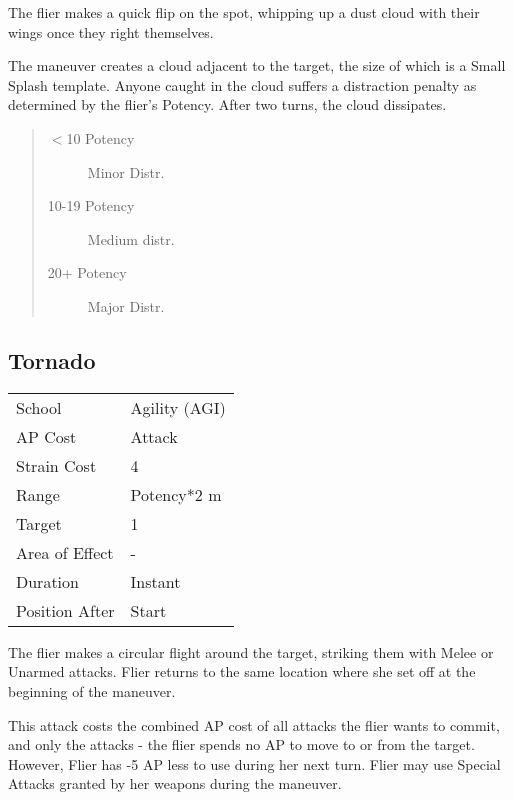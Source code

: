 \documentclass[11pt,a4paper,twocolumn]{book}
\begin{document}
\medskip

The flier makes a quick flip on the spot, whipping up a dust cloud with their wings once they right themselves. 

The maneuver creates a cloud adjacent to the target, the size of which is a Small Splash template. Anyone caught in the cloud suffers a distraction penalty as determined by the flier's Potency. After two turns, the cloud dissipates.

\begin{quote}
	\begin{description}
		\item[$<$10 Potency] 	Minor Distr.
		\item[10-19 Potency] 	Medium distr.
		\item[20+ Potency] 		Major Distr.
	\end{description}
\end{quote}


\subsection*{Tornado}
{
	\begin{tabu} to 75mm{| X[l,4] | X[l,7] |}
		\hline
		School 			& Agility (AGI) 	\\
		AP Cost	      	& Attack	 		\\
		Strain Cost     & 4 				\\
		Range     		& Potency*2 m 		\\
		Target      	& 1 				\\
		Area of Effect  & - 	 			\\
		Duration     	& Instant 	 		\\
		Position After  & Start 			\\ \hline
	\end{tabu}
	
}

\medskip

The flier makes a circular flight around the target, striking them with Melee or Unarmed attacks. Flier returns to the same location where she set off at the beginning of the maneuver.

This attack costs the combined AP cost of all attacks the flier wants to commit, and only the attacks - the flier spends no AP to move to or from the target. However, Flier has -5 AP less to use during her next turn. Flier may use Special Attacks granted by her weapons during the maneuver.
\end{document}
